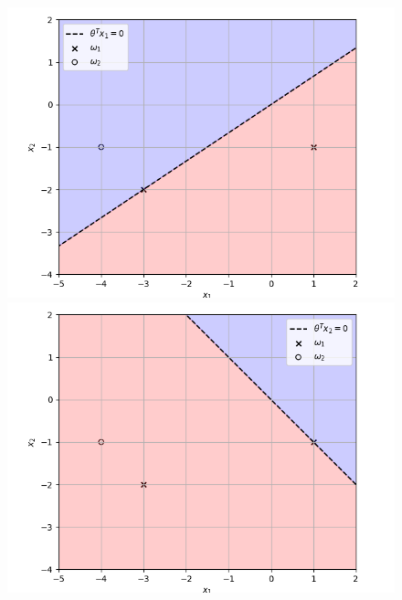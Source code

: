 \documentclass[a4paper, 10pt, twoside]{article}
\begin{document}
\begin{enumerate}[a)]
          \begin{figure}[h]
              \centering
              \begin{minipage}[t]{0.32\textwidth}
                  \centering
                  \includegraphics[width=\textwidth]{graph6.png}
              \end{minipage}\hfill
              \begin{minipage}[t]{0.32\textwidth}
                  \centering
                  \includegraphics[width=\textwidth]{graph8.png}
              \end{minipage}\hfill
              \begin{minipage}[t]{0.32\textwidth}
                  \centering

\end{minipage}
\end{figure}
\end{enumerate}
\end{document}
